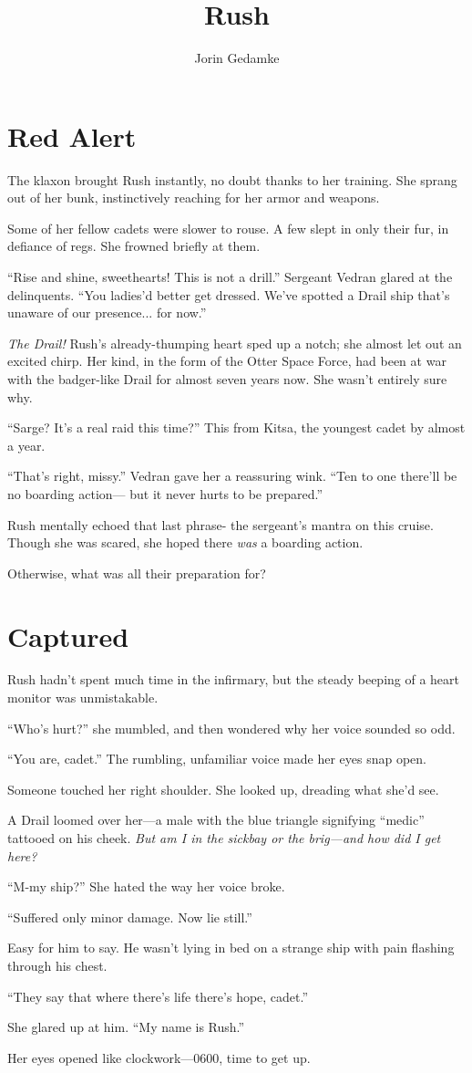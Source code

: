 \documentclass[12pt]{book}
\title{Rush}
\author{Jorin Gedamke}
\begin{document}
\maketitle
\mainmatter
\chapter{Red Alert}


The klaxon brought Rush instantly, no doubt thanks to her training.
She sprang out of her bunk, instinctively reaching for her armor and weapons.

Some of her fellow cadets were slower to rouse. A few slept in only their fur, in defiance of regs.
She frowned briefly at them.

``Rise and shine, sweethearts! This is not a drill.'' Sergeant Vedran glared at the delinquents. ``You ladies'd better get dressed.
We've spotted a Drail ship that's unaware of our presence... for now.''

\emph{The Drail!} Rush's already-thumping heart sped up a notch; she almost let out an excited chirp.
Her kind, in the form of the Otter Space Force, had been at war with the badger-like Drail for almost seven years now.
She wasn't entirely sure why.

``Sarge? It's a real raid this time?'' This from Kitsa, the youngest cadet by almost a year.

``That's right, missy.'' Vedran gave her a reassuring wink. ``Ten to one there'll be no boarding action---
but it never hurts to be prepared.''

Rush mentally echoed that last phrase- the sergeant's mantra on this cruise.
Though she was scared, she hoped there {\em was} a boarding action.

Otherwise, what was all their preparation for?

\chapter{Captured}

Rush hadn't spent much time in the infirmary, but the steady beeping of a heart monitor was unmistakable.

``Who's hurt?'' she mumbled, and then wondered why her voice sounded so odd.

``You are, cadet.'' The rumbling, unfamiliar voice made her eyes snap open.

Someone touched her right shoulder. She looked up, dreading what she'd see.

A Drail loomed over her---a male with the blue triangle signifying ``medic'' tattooed on his cheek.
{\em But am I in the sickbay or the brig---and how did I get here?}

``M-my ship?'' She hated the way her voice broke.

``Suffered only minor damage. Now lie still.''

Easy for him to say. He wasn't lying in bed on a strange ship with pain flashing through his chest.

``They say that where there's life there's hope, cadet.''

She glared up at him. ``My name is Rush.''

Her eyes opened like clockwork---0600, time to get up.
\end{document}
